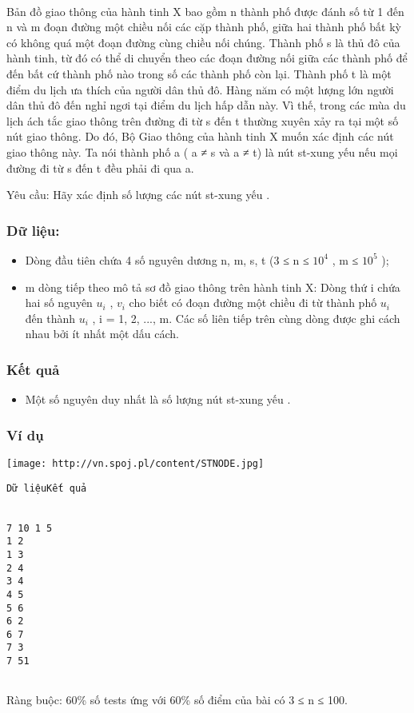 

 

Bản đồ giao thông của hành tinh X bao gồm n thành phố được đánh số từ 1 đến n và m đoạn đường một chiều nối các cặp thành phố, giữa hai thành phố bất kỳ có không quá một đoạn đường cùng chiều nối chúng. Thành phố s là thủ đô của hành tinh, từ đó có thể di chuyển theo các đoạn đường nối giữa các thành phố để đến bất cứ thành phố nào trong số các thành phố còn lại. Thành phố t là một điểm du lịch ưa thích của người dân thủ đô. Hàng năm có một lượng lớn người dân thủ đô đến nghỉ ngơi tại điểm du lịch hấp dẫn này. Vì thế, trong các mùa du lịch ách tắc giao thông trên đường đi từ s đến t thường xuyên xảy ra tại một số nút giao thông. Do đó, Bộ Giao thông của hành tinh X muốn xác định các nút giao thông này. Ta nói thành phố a ( a ≠ s và a ≠ t) là nút st-xung yếu nếu mọi đường đi từ s đến t đều phải đi qua a.





Yêu cầu: Hãy xác định số lượng các nút st-xung yếu .

\subsubsection{Dữ liệu:}
\begin{itemize}
	\item Dòng đầu tiên chứa 4 số nguyên dương n, m, s, t (3 ≤ n ≤ $10^{4}$ , m ≤ $10^{5}$ );
	\item m dòng tiếp theo mô tả sơ đồ giao thông trên hành tinh X: Dòng thứ i chứa hai số nguyên $u_{i}$ , $v_{i}$ cho biết có đoạn đường một chiều đi từ thành phố $u_{i}$ đến thành $u_{i}$ , i = 1, 2, ..., m. Các số liên tiếp trên cùng dòng được ghi cách nhau bởi ít nhất một dấu cách.
\end{itemize}

\subsubsection{Kết quả}
\begin{itemize}
	\item Một số nguyên duy nhất là số lượng nút st-xung yếu .
\end{itemize}

\subsubsection{Ví dụ}


\texttt{[image: http://vn.spoj.pl/content/STNODE.jpg]}
\begin{verbatim}
Dữ liệuKết quả


7 10 1 5
1 2
1 3
2 4
3 4
4 5
5 6
6 2
6 7
7 3
7 51


\end{verbatim}

Ràng buộc: 60\% số tests ứng với 60\% số điểm của bài có 3 ≤ n ≤ 100.
